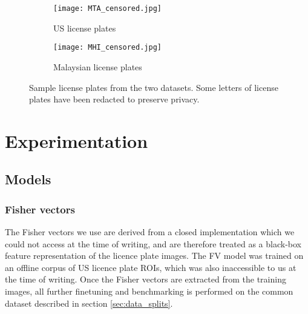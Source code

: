 \documentclass[10pt,twocolumn,letterpaper]{article}
\begin{document}
        \begin{figure}[!t]
        \centering
            \begin{subfigure}[b]{0.48\linewidth}
                \centering
                \texttt{[image: MTA\_censored.jpg]}
                \caption{US license plates}
                \label{fig:mta}
            \end{subfigure}
            \begin{subfigure}[b]{0.48\linewidth}
                \centering
                \texttt{[image: MHI\_censored.jpg]}
                \caption{Malaysian license plates}
                \label{fig:mhi}
            \end{subfigure}
            \caption{Sample license plates from the two datasets. Some letters of license plates have been redacted to preserve privacy.}
            \label{fig:mta_mhi}
        \end{figure}

\section{Experimentation \label{sec:expt}}

    \subsection{Models \label{sec:expt:models}}
        
        \subsubsection{Fisher vectors \label{sec:expt:models:fisher}}
            The Fisher vectors we use are derived from a closed implementation which we could not access at the time of writing, and are therefore treated as a black-box feature representation of the licence plate images. The FV model was trained on an offline corpus of US licence plate ROIs, which was also inaccessible to us at the time of writing. Once the Fisher vectors are extracted from the training images, all further finetuning and benchmarking is performed on the common dataset described in section \ref{sec:data_splits}.
            
\end{document}
